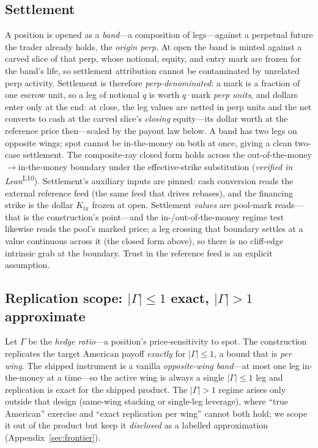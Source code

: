 \documentclass[runningheads]{llncs}
\newcommand{\tfp}{\emph{verified in Lean}}
\begin{document}
\subsection{Settlement}\label{sec:settlement}
A position is opened as a \emph{band}---a composition of legs---against a
perpetual future the trader already holds, the \emph{origin perp}. At open the
band is minted against a carved slice of that perp, whose notional, equity, and
entry mark are frozen for the band's life, so settlement attribution cannot be
contaminated by unrelated perp activity. Settlement is therefore
\emph{perp-denominated}: a mark is a fraction of one escrow unit, so a leg of
notional $q$ is worth $q\cdot\mathrm{mark}$ \emph{perp units}, and dollars enter
only at the end: at close, the leg values are netted in perp units and the net
converts to cash at the carved slice's \emph{closing} equity---its dollar worth at
the reference price then---scaled by the payout law below. A band has two legs on
opposite wings; spot cannot be in-the-money on both at once, giving a clean
two-case settlement. The composite-ray closed form holds across the
out-of-the-money$\to$in-the-money boundary under the effective-strike substitution
(\tfp{}\textsuperscript{L10}). Settlement's auxiliary inputs are
pinned: cash conversion reads the external reference feed (the same feed that
drives rebases), and the financing strike is the dollar $K_{\mathrm{tx}}$ frozen
at open. Settlement \emph{values} are pool-mark reads---that is the construction's
point---and the in-/out-of-the-money regime test likewise reads the pool's marked
price; a leg crossing that boundary settles at a value continuous across it (the
closed form above), so there is no cliff-edge intrinsic grab at the boundary.
Trust in the reference feed is an explicit assumption.

\subsection{Replication scope: $|\Gamma|\le1$ exact, $|\Gamma|>1$ approximate}
Let $\Gamma$ be the \emph{hedge ratio}---a position's price-sensitivity to spot.
The construction replicates the target American payoff \emph{exactly} for
$|\Gamma|\le1$, a bound that is \emph{per wing}. The shipped instrument is a
vanilla \emph{opposite-wing band}---at most one leg in-the-money at a time---so
the active wing is always a single $|\Gamma|\le1$ leg and replication is exact for
the shipped product. The $|\Gamma|>1$ regime arises only outside that design
(same-wing stacking or single-leg leverage), where ``true American'' exercise and
``exact replication per wing'' cannot both hold; we scope it out of the product
but keep it \emph{disclosed} as a labelled approximation
(Appendix~\ref{sec:frontier}).
\end{document}
